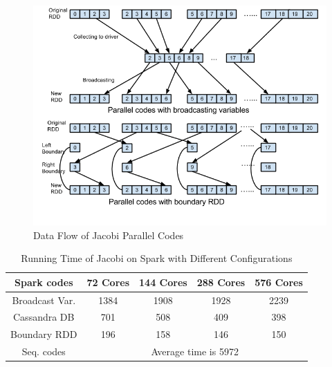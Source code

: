 \begin{figure}[h]
\centering
\includegraphics[scale=.6]{figures/JacobiCode.png}
\caption{Data Flow of Jacobi Parallel Codes}
\label{JacobiCode}
\end{figure}


\begin{table}[H]
\caption{Running Time of Jacobi on Spark with Different Configurations}
\centering
\begin{tabular}{||c| c c c c ||} 
 \hline
 Spark codes & 72 Cores & 144 Cores & 288 Cores & 576 Cores \\ [0.5ex] 
 \hline
 Broadcast Var. & 1384 & 1908 & 1928 & 2239 \\ 
 Cassandra DB   & 701  & 508  & 409  & 398  \\
 Boundary RDD   & 196  & 158  & 146  & 150  \\
 \hline
 \hline
 Seq. codes & \multicolumn{4}{c||}{Average time is 5972} \\ 
 \hline
\end{tabular}
\label{table:JacobiSpark}
\end{table}

